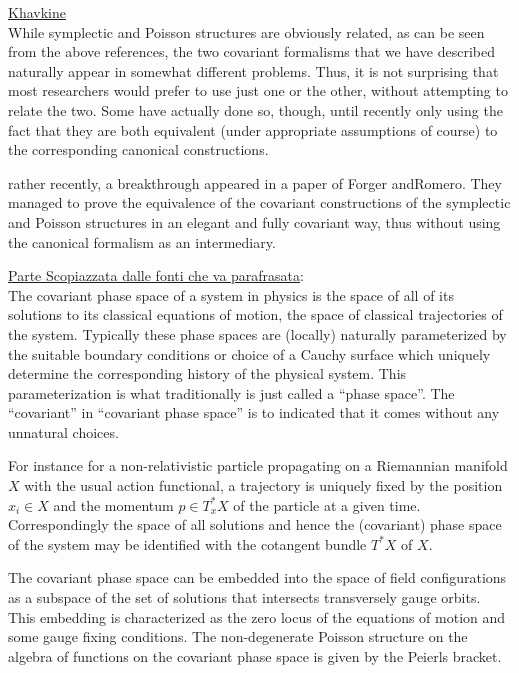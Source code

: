 \documentclass[Cascione]{subfiles}
\begin{document}
		\begin{Warning}
			\underline{Khavkine}\cite{Khavkine2014}\\
			While symplectic and Poisson structures are obviously related, as can be seen from the above references, the two covariant formalisms that we have described naturally appear in somewhat different problems. 
			Thus, it is not surprising that most researchers would prefer to use just one or the other, without attempting to relate the two.
			 Some have actually done so, though, until recently only using the fact that they are both equivalent (under appropriate assumptions of course) to the corresponding canonical constructions.
			 
			 rather recently, a breakthrough appeared in a paper of Forger andRomero. They managed to prove the equivalence of the covariant constructions of the symplectic and Poisson structures in an elegant and fully covariant way, thus without using the canonical formalism as an intermediary.

		\end{Warning}		
		
		\begin{Warning}
			\underline{Parte Scopiazzata dalle fonti che va parafrasata}:\\

			The covariant phase space of a system in physics is the space of all of its solutions to its classical equations of motion, the space of classical trajectories of the system. 
			Typically these phase spaces are (locally) naturally parameterized by the suitable boundary conditions or choice of a Cauchy surface which uniquely determine the corresponding history of the physical system. This parameterization is what traditionally is just called a “phase space”. 
			The “covariant” in “covariant phase space” is to indicated that it comes without any unnatural choices.
	
			For instance for a non-relativistic particle propagating on a Riemannian manifold $X$ with the usual action functional, a trajectory is uniquely fixed by the position $x_i \in X$ and the momentum $p\in T^*_x X$ of the particle at a given time. 
			Correspondingly the space of all solutions and hence the (covariant) phase space of the system may be identified with the cotangent bundle $T^*X$ of $X$.

 			The covariant phase space can be embedded into the space of field configurations as a subspace of the set of solutions that intersects transversely gauge orbits.  
			This embedding is characterized as the zero locus of the equations of motion and some gauge fixing conditions. The non-degenerate Poisson structure on the algebra of functions on the covariant phase space is given by the Peierls bracket.
		\end{Warning}
\end{document}
